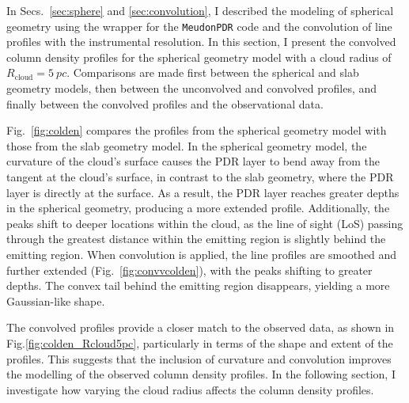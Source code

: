 \documentclass[12pt,a4paper]{article}
\newcommand{\mr}{\mathrm}
\newcommand{\mdpdr}{\texttt{MeudonPDR} code}
\begin{document}
In Secs.~\ref{sec:sphere} and \ref{sec:convolution}, I described the modeling of spherical geometry using the wrapper for the \mdpdr{} and the convolution of line profiles with the instrumental resolution. In this section, I present the convolved column density profiles for the spherical geometry model with a cloud radius of $R_\mr{cloud} = \qty{5}{pc}$. Comparisons are made first between the spherical and slab geometry models, then between the unconvolved and convolved profiles, and finally between the convolved profiles and the observational data.

Fig.~\ref{fig:colden} compares the profiles from the spherical geometry model with those from the slab geometry model. In the spherical geometry model, the curvature of the cloud's surface causes the PDR layer to bend away from the tangent at the cloud's surface, in contrast to the slab geometry, where the PDR layer is directly at the surface. As a result, the PDR layer reaches greater depths in the spherical geometry, producing a more extended profile. Additionally, the peaks shift to deeper locations within the cloud, as the line of sight (LoS) passing through the greatest distance within the emitting region is slightly behind the emitting region. When convolution is applied, the line profiles are smoothed and further extended (Fig.~\ref{fig:convvcolden}), with the peaks shifting to greater depths. The convex tail behind the emitting region disappears, yielding a more Gaussian-like shape. 

The convolved profiles provide a closer match to the observed data, as shown in Fig.\ref{fig:colden_Rcloud5pc}, particularly in terms of the shape and extent of the profiles. This suggests that the inclusion of curvature and convolution improves the modelling of the observed column density profiles. In the following section, I investigate how varying the cloud radius affects the column density profiles.
\end{document}
